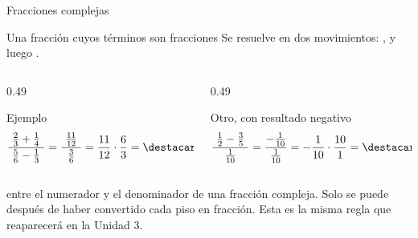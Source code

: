 \documentclass[aspectratio=169,10pt]{beamer}
\begin{document}
\begin{frame}{Fracciones complejas}
  \scriptsize
  \begin{block}{Una fracción cuyos términos son fracciones}
    \tiny
    Se resuelve en dos movimientos: , y luego .
  \end{block}

  \vspace{0.04cm}
  \begin{columns}[T,onlytextwidth]
    \begin{column}{0.49\textwidth}
      \begin{exampleblock}{Ejemplo}
        \tiny
        \[ \frac{\ \frac{2}{3}+\frac{1}{4}\ }
                {\ \frac{5}{6}-\frac{1}{3}\ }
         = \frac{\ \frac{11}{12}\ }{\ \frac{3}{6}\ }
         = \frac{11}{12}\cdot\frac{6}{3}
         = \destacar{\frac{11}{6}} \]
      \end{exampleblock}
    \end{column}
    \begin{column}{0.49\textwidth}
      \begin{exampleblock}{Otro, con resultado negativo}
        \tiny
        \[ \frac{\ \frac{1}{2}-\frac{3}{5}\ }{\ \frac{1}{10}\ }
         = \frac{-\frac{1}{10}}{\frac{1}{10}}
         = -\frac{1}{10}\cdot\frac{10}{1}
         = \destacar{-1} \]
      \end{exampleblock}
    \end{column}
  \end{columns}

  \vspace{0.0cm}
  {\tiny\color{uniGris}  entre el
  numerador y el denominador de una fracción compleja. Solo se puede después
  de haber convertido cada piso en  fracción. Esta es la misma
  regla que reaparecerá en la Unidad 3.}
\end{frame}
\end{document}
